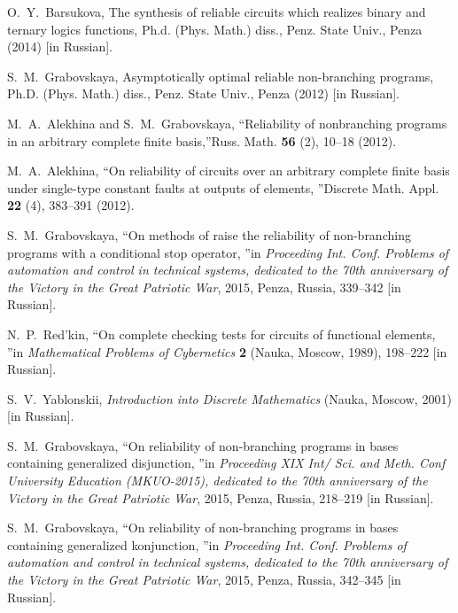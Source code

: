 \documentclass[
11pt,%
tightenlines,%
twoside,%
onecolumn,%
nofloats,%
nobibnotes,%
nofootinbib,%
superscriptaddress,%
noshowpacs,%
centertags]%
{revtex4}
\begin{document}
\begin{thebibliography}{99}
 O.~Y.~Barsukova, The synthesis of reliable
circuits  which realizes binary and ternary logics functions, Ph.d.
(Phys. Math.) diss., Penz. State Univ., Penza  (2014) [in Russian].

 S.~M.~Grabovskaya, Asymptotically optimal
reliable  non-branching programs, Ph.D. (Phys. Math.) diss., Penz.
State Univ., Penza  (2012) [in Russian].

 M.~A.~Alekhina and S.~M.~Grabovskaya,
\textquotedblleft  Reliability of nonbranching programs in an
arbitrary complete finite basis,\textquotedblright  Russ. Math.
\textbf{56}  (2), 10--18 (2012).

 M.~A.~Alekhina, \textquotedblleft On reliability
of circuits  over an arbitrary complete finite basis under
single-type constant faults at outputs of elements,
\textquotedblright Discrete Math. Appl. \textbf{22} (4), 383--391
(2012).

 S.~M.~Grabovskaya, \textquotedblleft On methods of
raise  the reliability of non-branching programs with a conditional
stop operator, \textquotedblright in \emph{Proceeding Int. Conf.
Problems of automation and control in technical systems, dedicated
to the 70th anniversary of the Victory in the Great Patriotic War},
2015, Penza, Russia, 339--342 [in Russian].

 N.~P.~Red'kin, \textquotedblleft On complete
checking  tests for circuits of functional elements,
\textquotedblright in \emph{Mathematical Problems of Cybernetics}
\textbf{2} (Nauka, Moscow, 1989), 198--222 [in Russian].

 S.~V.~Yablonskii, \emph{Introduction into Discrete
Mathematics}  (Nauka, Moscow, 2001) [in Russian].

 S.~M.~Grabovskaya, \textquotedblleft On
reliability  of non-branching programs in bases containing
generalized disjunction,  \textquotedblright in \emph{Proceeding XIX
Int/ Sci. and Meth. Conf University Education (MKUO-2015), dedicated
to the 70th anniversary of the Victory in the Great Patriotic War},
2015, Penza, Russia, 218--219 [in Russian].

 S.~M.~Grabovskaya, \textquotedblleft On
reliability  of non-branching programs in bases containing
generalized konjunction, \textquotedblright in \emph{Proceeding Int.
Conf. Problems of automation and control in technical systems,
dedicated to the 70th anniversary of the Victory in the Great
Patriotic War}, 2015, Penza, Russia, 342--345 [in Russian].

\end{thebibliography}
\end{document}
